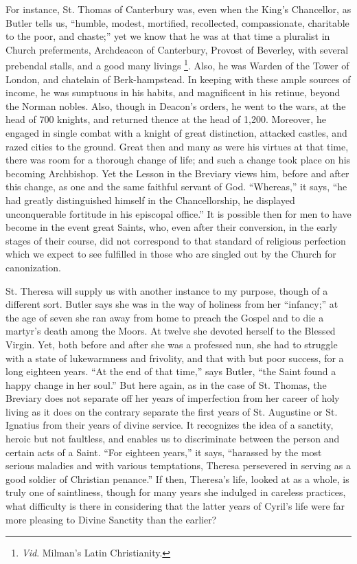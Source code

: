 For instance, St. Thomas of Canterbury was, even when the King's
Chancellor, as Butler tells us, ``humble, modest, mortified,
recollected, compassionate, charitable to the poor, and chaste;''
yet we know that he was at that time a pluralist in Church preferments,
Archdeacon of Canterbury, Provost of Beverley, with several prebendal
stalls, and a good many livings \footnote{\emph{Vid}.
Milman's Latin Christianity.}. Also, he was Warden of the Tower of London, and chatelain of
Berk-hampstead. In keeping with these ample sources of income, he was
sumptuous in his habits, and magnificent in his retinue, beyond
the Norman nobles. Also, though in Deacon's orders, he went to the
wars, at the head of 700 knights, and returned thence at the head of
1,200. Moreover, he engaged in single combat with a knight of great
distinction, attacked castles, and razed cities to the ground. Great
then and many as were his virtues at that time, there was room for a
thorough change of life; and such a change took place on his becoming
Archbishop. Yet the Lesson in the Breviary views him, before and after
this change, as one and the same faithful servant of God.
``Whereas,'' it says, ``he had greatly distinguished
himself in the Chancellorship, he displayed unconquerable fortitude in
his episcopal office.'' It is possible then for men to have become
in the event great Saints, who, even after their conversion, in the
early stages of their course, did not correspond to that standard of
religious perfection which we expect to see fulfilled in those who are
singled out by the Church for canonization.

St. Theresa will supply us with another instance to my purpose,
though of a different sort. Butler says she was in the way of holiness
from her ``infancy;'' at the age of seven she ran away from
home to preach the Gospel and to die a martyr's death among the Moors.
At twelve she devoted herself to the Blessed Virgin. Yet, both before
and after she was a professed nun, she had to struggle with a state of
lukewarmness and frivolity, and that with but poor success, for a long
eighteen years. ``At the end of that time,'' says Butler,
``the Saint found a happy change in her soul.'' But here
again, as in the case of St. Thomas, the Breviary does not separate
off her years of imperfection from her career of holy living as it
does on the contrary separate the first years of St. Augustine or St.
Ignatius from their years of divine service. It recognizes the
idea of a sanctity, heroic but not faultless, and enables us to
discriminate between the person and certain acts of a Saint. ``For
eighteen years,'' it says, ``harassed by the most serious
maladies and with various temptations, Theresa persevered in serving
as a good soldier of Christian penance.'' If then, Theresa's life,
looked at as a whole, is truly one of saintliness, though for many
years she indulged in careless practices, what difficulty is there in
considering that the latter years of Cyril's life were far more
pleasing to Divine Sanctity than the earlier?

